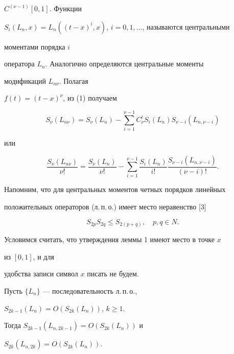 $C^{(\nu-1)}[0,1]$. Функции 


$S_i(L_n,x)=L_n((t-x)^i,x)$, $i=0,1,\dotsc$, называются центральными 


моментами порядка $i$ 


оператора $L_n$. Аналогично определяются центральные моменты 


модификаций $L_{n\nu}$. Полагая 


$f(t)=(t-x)^\nu$, из (1) получаем 


\begin{equation} 


S_\nu(L_{n\nu})=S_\nu(L_n)-\sum^{\nu-1}_{i=1} 


C^i_\nu S_i(L_n)S_{\nu-i}(L_{n,\nu-i}) 


\end{equation} 


или 


\begin{equation} 


\frac{S_\nu(L_{n\nu})}{\nu!}=\frac{S_\nu(L_n)}{\nu!} 


-\sum^{\nu-1}_{i=1}\frac{S_i(L_n)}{i!} 


\frac{S_{\nu-i}(L_{n,\nu-i})}{(\nu-i)!}. 


\end{equation} 


Напомним, что для центральных моментов четных порядков линейных 


положительных операторов (л.\,п.\,о.) имеет место неравенство [3] 


\begin{equation} 


S_{2p}S_{2q}\le S_{2(p+q)},\quad p,q\in N. 


\end{equation} 


 


Условимся считать, что утверждения леммы 1 имеют место в точке $x$ 


из $[0,1]$, и для 


удобства записи символ $x$ писать не будем. 


 


\begin{lem} 


Пусть $\{L_n\}$ --- последовательность л.\,п.\,о., 


$S_{2k-1}(L_n)=O(S_{2k}(L_n))$, $k\ge1$. 


Тогда $S_{2k-1}(L_{n,2k-1})=O(S_{2k}(L_n))$ и 


$S_{2k}(L_{n,2k})=O(S_{2k}(L_n))$. 


\end{lem} 


